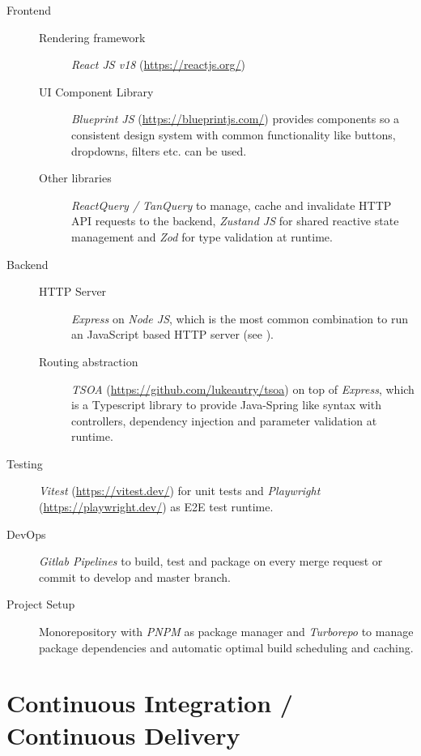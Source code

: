 \begin{description}
  \item[Frontend] \leavevmode
  \begin{description}
    \item[Rendering framework] \textendash{} \textit{React JS v18} (\url{https://reactjs.org/})
    \item[UI Component Library] \textendash{} \textit{Blueprint JS} (\url{https://blueprintjs.com/}) provides components so a consistent design system with common functionality like buttons, dropdowns, filters etc. can be used.
    \item[Other libraries] \textendash{} \textit{ReactQuery / TanQuery} to manage, cache and invalidate HTTP API requests to the backend, \textit{Zustand JS} for shared reactive state management and \textit{Zod} for type validation at runtime.
  \end{description}
  \item[Backend] \leavevmode
  \begin{description}
    \item[HTTP Server] \textendash{} \textit{Express} on \textit{Node JS}, which is the most common combination to run an JavaScript based HTTP server (see \cite{Github:VanoDevium/node-framework-stars}).
    \item[Routing abstraction] \textendash{} \textit{TSOA} (\url{https://github.com/lukeautry/tsoa}) on top of \textit{Express}, which is a Typescript library to provide Java-Spring like syntax with controllers, dependency injection and parameter validation at runtime.
  \end{description}
  \item[Testing] \textendash{} \textit{Vitest} (\url{https://vitest.dev/}) for unit tests and \textit{Playwright} (\url{https://playwright.dev/}) as E2E test runtime. 
  \item[DevOps] \textendash{} \textit{Gitlab Pipelines} to build, test and package on every merge request or commit to develop and master branch.
  \item[Project Setup] \textendash{} Monorepository with \textit{PNPM} as package manager and \textit{Turborepo} to manage package dependencies and automatic optimal build scheduling and caching.
\end{description}

\section{Continuous Integration / Continuous Delivery}

